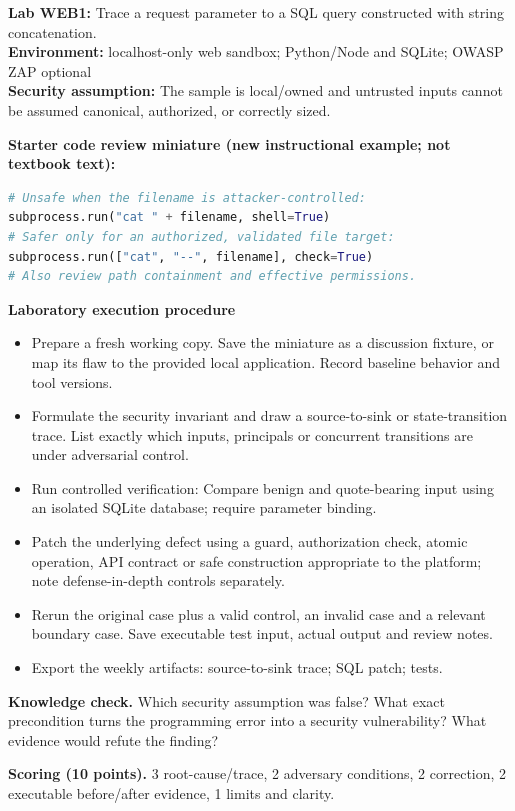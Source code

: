 \documentclass[10pt,letterpaper]{article}
\begin{document}
\begin{insight}\textbf{Lab WEB1:} Trace a request parameter to a SQL query constructed with string concatenation.\\\textbf{Environment:} localhost-only web sandbox; Python/Node and SQLite; OWASP ZAP optional\\\textbf{Security assumption:} The sample is local/owned and untrusted inputs cannot be assumed canonical, authorized, or correctly sized.\end{insight}
\textbf{Starter code review miniature (new instructional example; not textbook text):}
\begin{lstlisting}[language=Python]
# Unsafe when the filename is attacker-controlled:
subprocess.run("cat " + filename, shell=True)
# Safer only for an authorized, validated file target:
subprocess.run(["cat", "--", filename], check=True)
# Also review path containment and effective permissions.
\end{lstlisting}
\textbf{Laboratory execution procedure}
\begin{itemize}[leftmargin=*,itemsep=2pt]
\item Prepare a fresh working copy. Save the miniature as a discussion fixture, or map its flaw to the provided local application. Record baseline behavior and tool versions.
\item Formulate the security invariant and draw a source-to-sink or state-transition trace. List exactly which inputs, principals or concurrent transitions are under adversarial control.
\item Run controlled verification: Compare benign and quote-bearing input using an isolated SQLite database; require parameter binding.
\item Patch the underlying defect using a guard, authorization check, atomic operation, API contract or safe construction appropriate to the platform; note defense-in-depth controls separately.
\item Rerun the original case plus a valid control, an invalid case and a relevant boundary case. Save executable test input, actual output and review notes.
\item Export the weekly artifacts: source-to-sink trace; SQL patch; tests.
\end{itemize}
\textbf{Knowledge check.} Which security assumption was false? What exact precondition turns the programming error into a security vulnerability? What evidence would refute the finding?

\textbf{Scoring (10 points).} 3 root-cause/trace, 2 adversary conditions, 2 correction, 2 executable before/after evidence, 1 limits and clarity.
\end{document}
